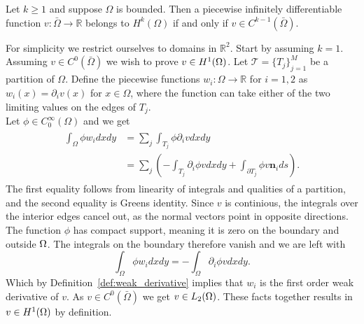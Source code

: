 
\begin{thmx}{\quad}
    Let $k\geq1$ and suppose $\Omega$ is bounded. Then a piecewise infinitely differentiable function $v:\bar{\Omega}\rightarrow \mathbb{R}$
    belongs to $H^k(\Omega)$ if and only if $v\in C^{k-1}(\bar{\Omega})$.
\end{thmx}

\begin{bev}
    For simplicity we restrict ourselves to domains in $\mathbb{R}^2$.
    Start by assuming $k=1$.
    Assuming $v\in C^0(\bar\Omega)$ we wish to prove $v\in H^1(\Omega)$. Let $\mathcal{T}={\{T_j\}}^M_{j=1}$ be a partition of $\Omega$.
    Define the piecewise functions $w_i:\Omega\rightarrow \mathbb{R}$ for $i=1,2$ as $w_i(x)=\partial_i v(x)$ for $x\in\Omega$,
     where the function can take either of the two limiting values on the edges of $T_j$. %
    \\
    Let $\phi\in C^{\infty}_0 (\Omega)$
   and we get
    \begin{align}
    \begin{split}
    \int_\Omega \phi w_i dxdy &= \sum_j\int_{T_j} \phi \partial_i v dx dy \\
        &= \sum_j \left( -\int_{T_j} \partial_i \phi v dxdy + \int_{\partial T_j} \phi v \mathbf{n}_i ds\right).
    \end{split}
    \end{align}
    The first equality follows from linearity of integrals and qualities of a partition, and the second equality is Greens identity.
    Since $v$ is continious, 
    the integrals over the interior edges cancel out,
    as the normal vectors point in opposite directions.
     The function $\phi$ has compact support, 
     meaning it is zero on the boundary and outside $\Omega$. 
     The integrals on the boundary therefore vanish and we are left with
    \begin{equation}
        \int_\Omega \phi w_i dxdy = -\int_\Omega \partial_i \phi v dxdy.
    \end{equation}
    Which by Definition~\ref{def:weak_derivative} implies that $w_i$ is the first order weak derivative of $v$.
    As $v\in C^0(\bar\Omega)$ we get $v \in L_2(\Omega)$. These facts together results in $v\in H^1(\Omega)$ by definition.


\end{bev}

